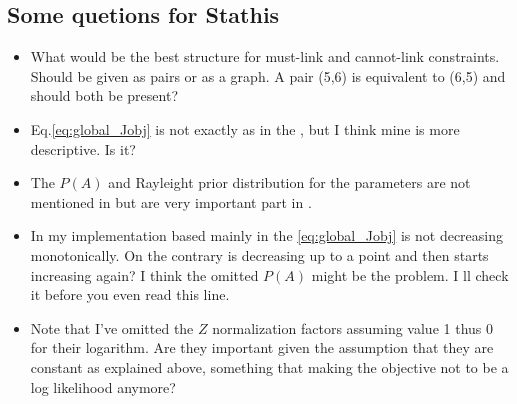 \documentclass[dvips,dvipdfm,pdftex]{llncs}
\begin{document}
\subsection{Some quetions for Stathis}
\begin{itemize}
	\item What would be the best structure for must-link and cannot-link constraints. Should be given as pairs or as a graph. A pair (5,6) is equivalent to (6,5) and should both be present?
	\item Eq.\ref{eq:global_Jobj} is not exactly as in the \cite{chapelle2006semi_hmrf_kmeans}, but I think mine is more descriptive. Is it?
	\item The $P(A)$ and Rayleight prior distribution for the parameters are not mentioned in \cite{basu2004probabilistic} but are very important part in \cite{chapelle2006semi_hmrf_kmeans}.
	\item In my implementation based mainly in \cite{basu2004probabilistic} the \ref{eq:global_Jobj} is not decreasing monotonically. On the contrary is decreasing up to a point and then starts increasing again? I think the omitted $P(A)$ might be the problem. I ll check it before you even read this line.
	\item Note that I've omitted the $Z$ normalization factors assuming value 1 thus 0 for their logarithm. Are they important given the assumption that they are constant as explained above, something that making the objective not to be a log likelihood anymore?
\end{itemize}



\end{document}
